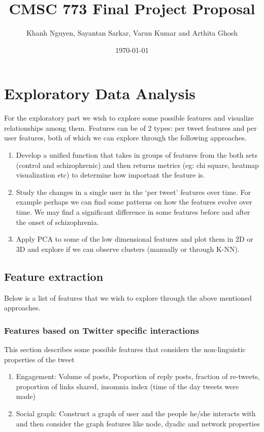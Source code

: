 \documentclass[10pt]{article}
\title{CMSC 773 Final Project Proposal}
\author{Khanh Nguyen, Sayantan Sarkar, Varun Kumar and Arthita Ghosh\\}
\date{\today}
\begin{document}
\maketitle


\section{Exploratory Data Analysis}
For the exploratory part we wish to explore some possible features and visualize relationships among them. Features can be of 2 types: per tweet features and per user features, both of which we can explore through the following approaches.
\begin{enumerate}
\item Develop a unified function that takes in groups of features from the both sets (control and schizophrenic) and then returns metrics (eg: chi square, heatmap visualization etc) to determine how important the feature is. 
\item Study the changes in a single user in the ‘per tweet’ features over time. For example perhaps we can find some patterns on how the features evolve over time. We may find a significant difference in some features before and after the onset of schizophrenia.
\item Apply PCA to some of the low dimensional features and plot them in 2D or 3D and explore if we can observe clusters (manually or through K-NN).
\end{enumerate}



\subsection{Feature extraction}

Below is a list of features that we wish to explore through the above mentioned approaches.

\subsubsection{Features based on Twitter specific interactions}
This section describes some possible features that considers the non-linguistic properties of the tweet \cite{export:192721}
\begin{enumerate}
\item Engagement: Volume of posts, Proportion of reply posts, fraction of re-tweets, proportion of links shared, insomnia index (time of the day tweets were made)
\item Social graph: Construct a graph of user and the people he/she interacts with and then consider the graph features like node, dyadic and network properties

\end{enumerate}
\end{document}
